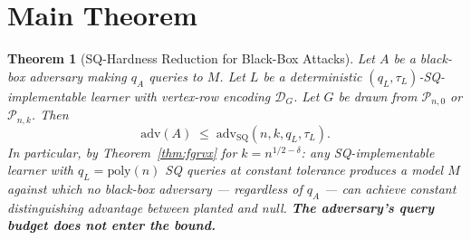 \documentclass[11pt,a4paper]{article}
\newtheorem{theorem}{Theorem}
\theoremstyle{definition}
\theoremstyle{remark}
\newcommand{\Pnk}{\mathcal{P}_{n,k}}
\newcommand{\Pnzero}{\mathcal{P}_{n,0}}
\newcommand{\DG}{\mathcal{D}_G}
\newcommand{\Adv}{\mathrm{adv}}
\newcommand{\AdvSQ}{\Adv_{\mathrm{SQ}}}
\begin{document}
\section{Main Theorem}

\begin{theorem}[SQ-Hardness Reduction for Black-Box Attacks]\label{thm:main}
Let $A$ be a black-box adversary making $q_A$ queries to $M$. Let $L$ be a deterministic $(q_L, \tau_L)$-SQ-implementable learner with vertex-row encoding $\DG$. Let $G$ be drawn from $\Pnzero$ or $\Pnk$. Then
\[
\Adv(A) \;\le\; \AdvSQ(n, k, q_L, \tau_L).
\]
In particular, by Theorem~\ref{thm:fgrvx} for $k = n^{1/2 - \delta}$: any SQ-implementable learner with $q_L = \mathrm{poly}(n)$ SQ queries at constant tolerance produces a model $M$ against which \emph{no} black-box adversary --- regardless of $q_A$ --- can achieve constant distinguishing advantage between planted and null. \textbf{The adversary's query budget does not enter the bound.}
\end{theorem}
\end{document}
